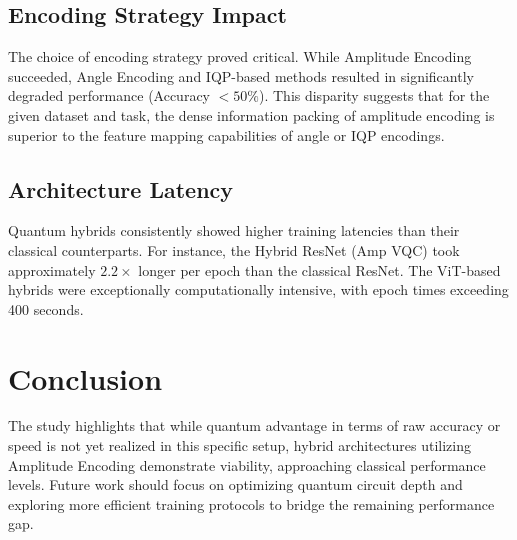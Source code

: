 \documentclass{article}
\begin{document}
\subsection{Encoding Strategy Impact}
The choice of encoding strategy proved critical. While Amplitude Encoding succeeded, Angle Encoding and IQP-based methods resulted in significantly degraded performance (Accuracy $< 50\%$). This disparity suggests that for the given dataset and task, the dense information packing of amplitude encoding is superior to the feature mapping capabilities of angle or IQP encodings.

\subsection{Architecture Latency}
Quantum hybrids consistently showed higher training latencies than their classical counterparts. For instance, the Hybrid ResNet (Amp VQC) took approximately $2.2\times$ longer per epoch than the classical ResNet. The ViT-based hybrids were exceptionally computationally intensive, with epoch times exceeding 400 seconds.

\section{Conclusion}
The study highlights that while quantum advantage in terms of raw accuracy or speed is not yet realized in this specific setup, hybrid architectures utilizing Amplitude Encoding demonstrate viability, approaching classical performance levels. Future work should focus on optimizing quantum circuit depth and exploring more efficient training protocols to bridge the remaining performance gap.
\end{document}
